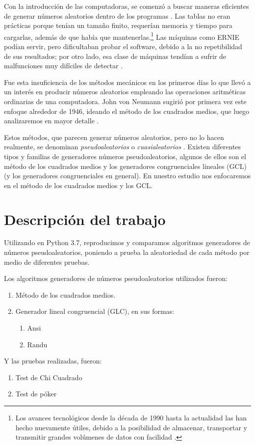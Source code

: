 Con la introducción de las computadoras, se comenzó a buscar maneras eficientes de generar números aleatorios dentro de los programas \cite{knuth1997seminumerical}. Las tablas no eran prácticas porque tenían un tamaño finito, requerían memoria y tiempo para cargarlas, además de que había que mantenerlas.\footnote{Los avances tecnológicos desde la década de 1990 hasta la actualidad las han hecho nuevamente útiles, debido a la posibilidad de almacenar, transportar y transmitir grandes volúmenes de datos con facilidad \cite{knuth1997seminumerical}.} Las máquinas como ERNIE podían servir, pero dificultaban probar el software, debido a la no repetibilidad de sus resultados; por otro lado, esa clase de máquinas tendían a sufrir de malfunciones muy difíciles de detectar \cite{knuth1997seminumerical}.

Fue esta insuficiencia de los métodos mecánicos en los primeros días lo que llevó a un interés en producir números aleatorios empleando las operaciones aritméticas ordinarias de una computadora. John von Neumann sugirió por primera vez este enfoque alrededor de 1946, ideando el método de los cuadrados medios, que luego analizaremos en mayor detalle \cite{knuth1997seminumerical}.

Estos métodos, que parecen generar números aleatorios, pero no lo hacen realmente, se denominan \emph{pseudoaleatorios} o \emph{cuasialeatorios} \cite{knuth1997seminumerical}. Existen diferentes tipos y familias de generadores números pseudoaleatorios, algunos de ellos son el método de los cuadrados medios y los generadores congruenciales lineales (GCL) (y los generadores congruenciales en general). En nuestro estudio nos enfocaremos en el método de los cuadrados medios y los GCL.

\section{Descripción del trabajo}
    Utilizando en Python 3.7, reproducimos y comparamos algoritmos generadores de números pseudoaleatorios, poniendo a prueba
    la aleatoriedad de cada método por medio de diferentes pruebas.

    Los algoritmos generadores de números pseudoaleatorios utilizados fueron:
\begin{enumerate}
    \item Método de los cuadrados medios.
    \item Generador lineal congruencial (GLC), en sus formas:
    \begin{enumerate}
        \item Ansi
        \item Randu
    \end{enumerate}
\end{enumerate}
    Y las pruebas realizadas, fueron:
\begin{enumerate}
    \item Test de Chi Cuadrado
    \item Test de póker
\end{enumerate}


